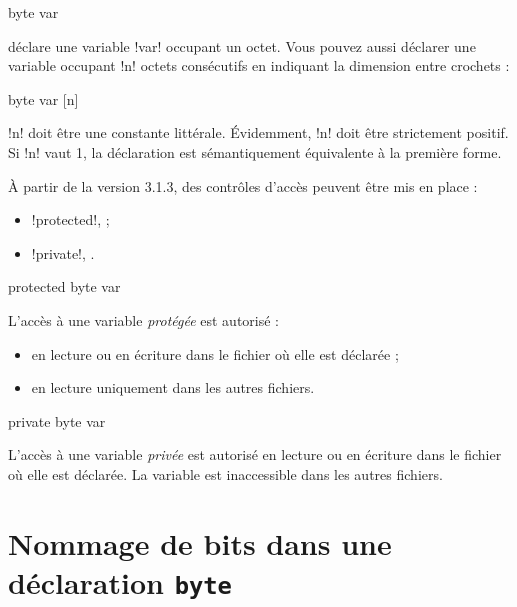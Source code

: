 \begin{piccolo}
byte var 
\end{piccolo}

déclare une variable \pic!var! occupant un octet. Vous pouvez aussi déclarer une variable occupant \pic!n! octets consécutifs en indiquant la dimension entre crochets :

\begin{piccolo}
byte var [n]
\end{piccolo}

\pic!n! doit être une constante littérale. Évidemment, \pic!n! doit être strictement positif. Si \pic!n! vaut 1, la déclaration est sémantiquement équivalente à la première forme.


À partir de la version 3.1.3, des contrôles d'accès peuvent être mis en place :
\begin{itemize}
  \item \pic!protected!,  ;
  \item \pic!private!, .
\end{itemize}


\begin{piccolo}
protected byte var
\end{piccolo}

L'accès à une variable \emph{protégée} est autorisé :
\begin{itemize}
\item en lecture ou en écriture dans le fichier où elle est déclarée ;
\item en lecture uniquement dans les autres fichiers.
\end{itemize}



\begin{piccolo}
private byte var
\end{piccolo}

L'accès à une variable \emph{privée} est autorisé en lecture ou en écriture dans le fichier où elle est déclarée. La variable est inaccessible dans les autres fichiers.




\section{Nommage de bits dans une déclaration \texttt{byte}}

